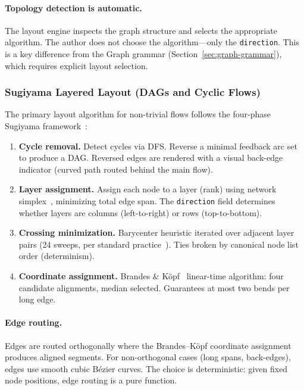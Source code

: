 \paragraph{Topology detection is automatic.}
The layout engine inspects the graph structure and selects the appropriate algorithm. The author does not choose the algorithm---only the \texttt{direction}. This is a key difference from the Graph grammar (Section~\ref{sec:graph-grammar}), which requires explicit layout selection.

\subsubsection{Sugiyama Layered Layout (DAGs and Cyclic Flows)}

The primary layout algorithm for non-trivial flows follows the four-phase Sugiyama framework~\cite{sugiyama1981}:

\begin{enumerate}
  \item \textbf{Cycle removal.} Detect cycles via DFS. Reverse a minimal feedback arc set to produce a DAG. Reversed edges are rendered with a visual back-edge indicator (curved path routed behind the main flow).
  
  \item \textbf{Layer assignment.} Assign each node to a layer (rank) using network simplex~\cite{gansner1993dot}, minimizing total edge span. The \texttt{direction} field determines whether layers are columns (left-to-right) or rows (top-to-bottom).
  
  \item \textbf{Crossing minimization.} Barycenter heuristic iterated over adjacent layer pairs (24 sweeps, per standard practice~\cite{sugiyama1981}). Ties broken by canonical node list order (determinism).
  
  \item \textbf{Coordinate assignment.} Brandes \& K\"opf~\cite{brandesKopf2001} linear-time algorithm: four candidate alignments, median selected. Guarantees at most two bends per long edge.
\end{enumerate}

\paragraph{Edge routing.}
Edges are routed orthogonally where the Brandes--K\"opf coordinate assignment produces aligned segments. For non-orthogonal cases (long spans, back-edges), edges use smooth cubic B\'ezier curves. The choice is deterministic: given fixed node positions, edge routing is a pure function.

